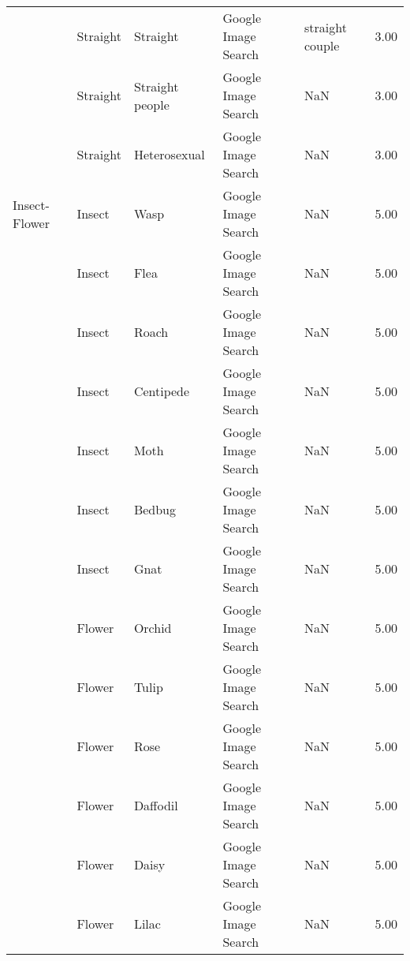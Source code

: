 \begin{tabular}{lllllr}
     & Straight &           Straight &  Google Image Search &                                    straight couple &  3.00 \\
     & Straight &    Straight people &  Google Image Search &                                                NaN &  3.00 \\
     & Straight &       Heterosexual &  Google Image Search &                                                NaN &  3.00 \\
Insect-Flower & Insect &               Wasp &  Google Image Search &                                                NaN &  5.00 \\
     & Insect &               Flea &  Google Image Search &                                                NaN &  5.00 \\
     & Insect &              Roach &  Google Image Search &                                                NaN &  5.00 \\
     & Insect &          Centipede &  Google Image Search &                                                NaN &  5.00 \\
     & Insect &               Moth &  Google Image Search &                                                NaN &  5.00 \\
     & Insect &             Bedbug &  Google Image Search &                                                NaN &  5.00 \\
     & Insect &               Gnat &  Google Image Search &                                                NaN &  5.00 \\
     & Flower &             Orchid &  Google Image Search &                                                NaN &  5.00 \\
     & Flower &              Tulip &  Google Image Search &                                                NaN &  5.00 \\
     & Flower &               Rose &  Google Image Search &                                                NaN &  5.00 \\
     & Flower &           Daffodil &  Google Image Search &                                                NaN &  5.00 \\
     & Flower &              Daisy &  Google Image Search &                                                NaN &  5.00 \\
     & Flower &              Lilac &  Google Image Search &                                                NaN &  5.00 \\

\end{tabular}
